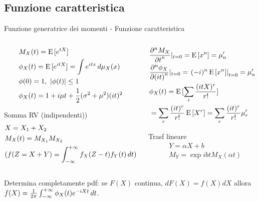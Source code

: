 \subsection{Funzione caratteristica}

\begin{frame}{Funzione generatrice dei momenti - Funzione caratteristica}
\begin{columns}[T]
	\begin{column}{0.5\textwidth}
		\begin{align*}
		&M_X(t)=\E{[\exp{tX}]}\\
		&\phi_X(t)=\E{[\exp{itX}]}=\int\exp{itx}\,d\mu_X(x)\\
		&\phi(0)=1,\ |\phi(t)|\leq1\\
		&\phi_X(t)=1+i\mu t+\frac{1}{2}(\sigma^2+\mu^2)(it)^2
		\end{align*}
		\begin{block}{Somma RV (indipendenti))}
			\begin{align*}
			&X=X_1+X_2\\
			&M_X(t)=M_{X_1}M_{X_2}\\
			&(f(Z=X+Y)=\intsinf{}f_X(Z-t)f_Y(t)\,dt)
			\end{align*}
		\end{block}
	\end{column}
	\begin{column}{0.5\textwidth}
		\begin{align*}
		&\PDyn{t}{M_X}{n}|_{t=0}=\E{[x^n]}=\mu_n'\\
		&\PDyn{(it)}{\phi_X}{n}|_{t=0}=\left.(-i)^n\E{[x^n]}\right|_{t=0}=\mu_n'\\
		&\phi_X(t)=\E{[\sum_r\frac{(itX)^r}{r!}]}\\
		&=\sum_r\frac{(it)^r}{r!}\E{[X^r]}=\sum_r\frac{(it)^r}{r!}\mu_r'
		\end{align*}
		\begin{block}{Trasf lineare}
			\begin{align*}
			&Y=\alpha X+b\\
			&M_Y=\exp{ibt}M_X(\alpha t)
			\end{align*}
		\end{block}
	\end{column}
\end{columns}
Determina completamente pdf: se $F(X)$ continua, $dF(X)=f(X)dX$ allora $f(X)=\frac{1}{2\pi}\intsinf{}\phi_X(t)\exp{-iXt}\,dt$.
\end{frame}


